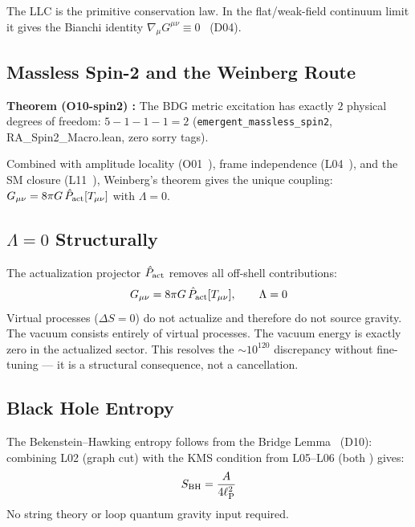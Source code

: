 \documentclass[12pt,a4paper]{article}
\begin{document}
The LLC is the primitive conservation law.  In the flat/weak-field continuum limit it gives the Bianchi identity $\nabla_\mu G^{\mu\nu} \equiv 0$ \statusDR\ (D04).

\subsection{Massless Spin-2 and the Weinberg Route}

\begin{leanbox}
\textbf{Theorem (O10-spin2) \statusLV:} The BDG metric excitation has exactly $2$ physical degrees of freedom: $5 - 1 - 1 - 1 = 2$ (\texttt{emergent\_massless\_spin2}, RA\_Spin2\_Macro.lean, zero sorry tags).
\end{leanbox}

Combined with amplitude locality (O01~\statusLV), frame independence (L04~\statusLV), and the SM closure (L11~\statusLV), Weinberg's theorem \cite{Weinberg1964} gives the unique coupling: $G_{\mu\nu} = 8\pi G\,\hat{P}_{\mathrm{act}}[T_{\mu\nu}]$ with $\Lambda=0$.

\subsection{$\Lambda = 0$ Structurally}

The actualization projector $\hat{P}_{\mathrm{act}}$ removes all off-shell contributions:
\begin{equation}
  G_{\mu\nu} = 8\pi G\,\hat{P}_{\mathrm{act}}[T_{\mu\nu}], \qquad \Lambda = 0
  \label{eq:GR}
\end{equation}
Virtual processes ($\Delta S = 0$) do not actualize and therefore do not source gravity.  The vacuum consists entirely of virtual processes.  The vacuum energy is exactly zero in the actualized sector.  This resolves the $\sim10^{120}$ discrepancy without fine-tuning — it is a structural consequence, not a cancellation.

\subsection{Black Hole Entropy}

The Bekenstein--Hawking entropy follows from the Bridge Lemma \statusDR\ (D10): combining L02 (graph cut) with the KMS condition from L05--L06 (both \statusLV) gives:
\begin{equation}
  S_{\mathrm{BH}} = \frac{A}{4\ell_{\mathrm{P}}^2}
  \label{eq:bh}
\end{equation}
No string theory or loop quantum gravity input required.
\end{document}
